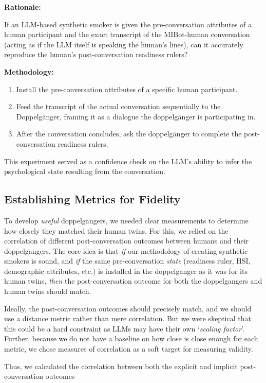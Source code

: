 \textbf{Rationale:} 

If an LLM-based synthetic smoker is given the pre-conversation attributes of a human participant and the exact transcript of the MIBot-human conversation (acting as if the LLM itself is speaking the human's lines), can it accurately reproduce the human's post-conversation readiness rulers?

\textbf{Methodology:}
\begin{enumerate}
    \item Install the pre-conversation attributes of a specific human participant.
    \item Feed the transcript of the actual conversation sequentially to the Doppelgänger, framing it as a dialogue the doppelgänger is participating in.
    \item After the conversation concludes, ask the doppelgänger to complete the post-conversation readiness rulers.
\end{enumerate}

This experiment served as a confidence check on the LLM's ability to infer the psychological state resulting from the conversation.



\subsection{Establishing Metrics for Fidelity}
\label{sec:synthetic-smoker-validation}
To develop \emph{useful} doppelgängers, we needed clear measurements to determine how closely they matched their human twins. For this, we relied on the correlation of different post-conversation outcomes between humans and their doppelgangers. The core idea is that \emph{if} our methodology of creating synthetic smokers is sound, and \emph{if} the same pre-conversation \emph{state} (readiness ruler, HSI, demographic attributes, etc.) is installed in the doppelganger as it was for its human twins, \emph{then} the post-conversation outcome for both the doppelgangers and human twins should match. 

Ideally, the post-conversation outcomes should precisely match, and we should use a distance metric rather than mere correlation. But we were skeptical that this could be a hard constraint as LLMs may have their own `\textit{scaling factor}'. Further, because we do not have a baseline on how close is close enough for each metric, we chose measures of correlation as a soft target for measuring validity.

Thus, we calculated the correlation between both the explicit and implicit post-conversation outcomes


